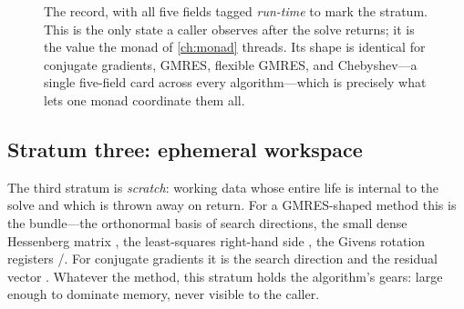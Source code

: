 \begin{figure}[t]
\centering
{}
\caption[The  record card]{The  record, with all
five fields tagged \emph{run-time} to mark the stratum. This is the only state a
caller observes after the solve returns; it is the value the  monad
of \cref{ch:monad} threads. Its shape is identical for conjugate gradients,
GMRES, flexible GMRES, and Chebyshev---a single five-field card across every
algorithm---which is precisely what lets one monad coordinate them all.}
\label{fig:simstatecard}
\end{figure}

\subsection{Stratum three: ephemeral \texorpdfstring{}{Krylov} workspace}

The third stratum is \emph{scratch}: working data whose entire life is internal
to the solve and which is thrown away on return. For a GMRES-shaped method this
is the  bundle---the orthonormal basis  of search
directions, the small dense Hessenberg matrix , the least-squares
right-hand side , the Givens rotation registers /. For
conjugate gradients it is the search direction  and the residual vector
. Whatever the method, this stratum holds the algorithm's gears: large
enough to dominate memory, never visible to the caller.

